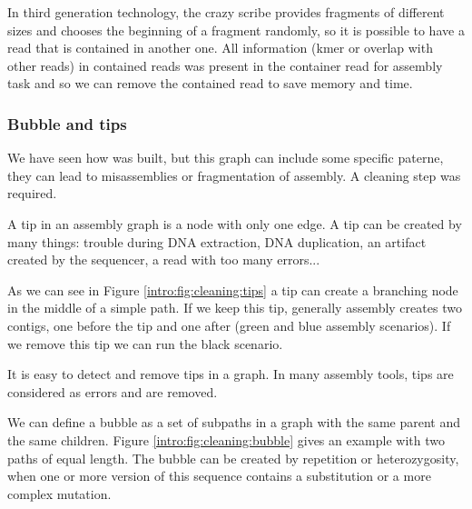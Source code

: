 \documentclass[main]{subfiles}
\begin{document}
In third generation technology, the crazy scribe provides fragments of different sizes and chooses the beginning of a fragment randomly, so it is possible to have a read that is contained in another one. All information (kmer or overlap with other reads) in contained reads was present in the container read for assembly task and so we can remove the contained read to save memory and time.

\subsubsection{Bubble and tips} \label{intro:subsubsec:bubble_tips}

We have seen how \OLC was built, but this graph can include some specific paterne, they can lead to misassemblies or fragmentation of assembly. A cleaning step was required.

\begin{figure}[ht]
    \caption{}
    \label{intro:fig:cleaning}
\end{figure}

A tip in an assembly graph is a node with only one edge. A tip can be created by many things: trouble during DNA extraction, DNA duplication, an artifact created by the sequencer, a read with too many errors...

As we can see in Figure \ref{intro:fig:cleaning:tips} a tip can create a branching node in the middle of a simple path. If we keep this tip, generally assembly creates two contigs, one before the tip and one after (green and blue assembly scenarios). If we remove this tip we can run the black scenario.

It is easy to detect and remove tips in a graph. In many assembly tools, tips are considered as errors and are removed.

We can define a bubble as a set of subpaths in a graph with the same parent and the same children. Figure \ref{intro:fig:cleaning:bubble} gives an example with two paths of equal length. The bubble can be created by repetition or heterozygosity, when one or more version of this sequence contains a substitution or a more complex mutation.
\end{document}
